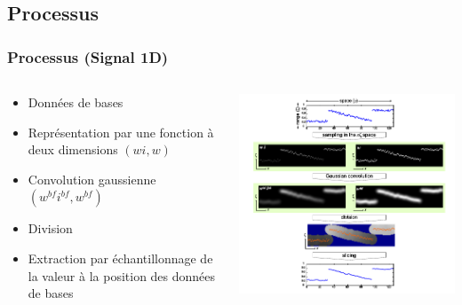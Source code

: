 \documentclass[compress]{beamer}
\begin{document}
\subsection{Processus}
\begin{frame}\frametitle{Processus (Signal 1D)}
	\begin{columns}[t]
  		\begin{column}{5cm}
  			\begin{block}{}
    			\begin{itemize}
    				\item Données de bases
    				\item Représentation par une fonction à deux dimensions $(wi,w)$ 	
    				\item Convolution gaussienne $(w^{bf}i^{bf},w^{bf})$ 
    				\item Division
    				\item  Extraction par échantillonnage de la valeur à la position des données de bases
    			\end{itemize}
 			 \end{block} 
 		 \end{column}
  
		\begin{column}{6cm}
			\center
			\includegraphics[scale=0.3]{images/processConvo.png}  
  		\end{column}
 	\end{columns} 	
	
	
\end{frame}
\end{document}
